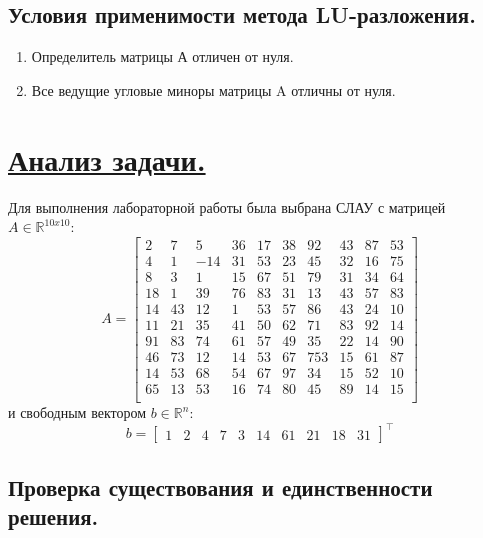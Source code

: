 \documentclass[a4paper, 12pt]{article}
\begin{document}
	\subsection{Условия применимости метода LU-разложения.}
	
	\begin{enumerate}
		\item Определитель матрицы А отличен от нуля.
		\item Все ведущие угловые миноры матрицы A отличны от нуля.
	\end{enumerate}

	\section{\underline{Анализ задачи.}}
	
	Для выполнения лабораторной работы была выбрана СЛАУ с матрицей $A\in\mathbb{R}^{10x10}$:
	\begin{equation}
		\label{A_matrix}
		A=
		\begin{bmatrix}
			2 & 7 & 5 & 36 & 17 & 38 & 92 & 43 & 87 & 53 \\
			4 & 1 & -14 & 31 & 53 & 23 & 45 & 32 & 16 & 75 \\
			8 & 3 & 1 & 15& 67& 51& 79& 31& 34& 64 \\
			18 & 1 & 39 & 76 & 83 & 31 & 13 & 43 & 57 & 83 \\
			14 & 43 & 12 & 1 & 53 & 57 & 86 & 43 & 24 & 10 \\
			11 & 21 & 35 & 41 & 50 & 62 & 71 & 83 & 92 & 14 \\
			91 & 83 & 74 & 61 & 57 & 49 & 35 & 22 & 14 & 90 \\
			46 & 73 & 12 & 14 & 53 & 67 & 753 & 15 & 61 & 87 \\
			14 & 53 & 68 & 54 & 67 & 97 & 34 & 15 & 52 & 10 \\
			65 & 13 & 53 & 16 & 74 & 80 & 45 & 89 & 14 & 15 \\
		\end{bmatrix}
	\end{equation} 
	и свободным вектором $b\in\mathbb{R}^n$:
	\begin{equation}
		\label{b_vector}
		b=
		\begin{bmatrix}
			1 & 2 & 4 & 7 & 3 & 14 & 61 & 21 & 18 & 31
		\end{bmatrix}
		^\top
	\end{equation}
	
	\subsection{Проверка существования и единственности решения.}
	
\end{document}
